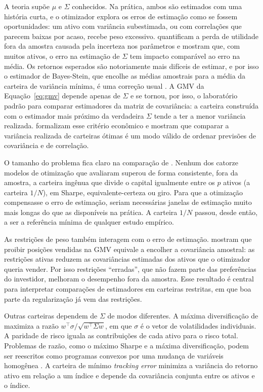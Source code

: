A teoria supõe $\mu$ e $\Sigma$ conhecidos. Na prática, ambos são estimados com uma história curta, e o
otimizador explora os erros de estimação como se fossem oportunidades: um ativo com variância
subestimada, ou com correlações que parecem baixas por acaso, recebe peso excessivo. \citet{kan2007}
quantificam a perda de utilidade fora da amostra causada pela incerteza nos parâmetros e mostram que,
com muitos ativos, o erro na estimação de $\Sigma$ tem impacto comparável ao erro na média. Os retornos
esperados são notoriamente mais difíceis de estimar, e por isso o estimador de Bayes-Stein, que encolhe
as médias amostrais para a média da carteira de variância mínima, é uma correção usual \citep{jorion1986}.
A GMV da Equação~\eqref{eq:gmv} depende apenas de $\Sigma$ e se tornou, por isso, o laboratório padrão
para comparar estimadores da matriz de covariância: a carteira construída com o estimador mais próximo
da verdadeira $\Sigma$ tende a ter a menor variância realizada. \citet{engle2006} formalizam esse
critério econômico e mostram que comparar a variância realizada de carteiras ótimas é um modo válido de
ordenar previsões de covariância e de correlação.

O tamanho do problema fica claro na comparação de \citet{demiguel2009}. Nenhum dos catorze modelos de
otimização que avaliaram superou de forma consistente, fora da amostra, a carteira ingênua que divide o
capital igualmente entre os $p$ ativos (a carteira $1/N$), em Sharpe, equivalente-certeza ou giro. Para
que a otimização compensasse o erro de estimação, seriam necessárias janelas de estimação muito mais
longas do que as disponíveis na prática. A carteira $1/N$ passou, desde então, a ser a referência
mínima de qualquer estudo empírico.

As restrições de peso também interagem com o erro de estimação. \citet{jagannathan2003} mostram que
proibir posições vendidas na GMV equivale a encolher a covariância amostral: as restrições ativas
reduzem as covariâncias estimadas dos ativos que o otimizador queria vender. Por isso restrições
``erradas'', que não fazem parte das preferências do investidor, melhoram o desempenho fora da amostra.
Esse resultado é central para interpretar comparações de estimadores em carteiras restritas, em que boa
parte da regularização já vem das restrições.

Outras carteiras dependem de $\Sigma$ de modos diferentes. A máxima diversificação de
\citet{choueifaty2008} maximiza a razão $w^\top\sigma/\sqrt{w^\top\Sigma w}$, em que $\sigma$ é o vetor
de volatilidades individuais. A paridade de risco iguala as contribuições de cada ativo para o risco
total. Problemas de razão, como o máximo Sharpe e a máxima diversificação, podem ser reescritos como
programas convexos por uma mudança de variáveis homogênea \citep{cornuejols2007}. A carteira de mínimo
\emph{tracking error} minimiza a variância do retorno ativo em relação a um índice e depende da
covariância conjunta entre os ativos e o índice.

